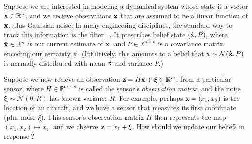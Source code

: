\begin{subappendices}
    \begin{example}
    \label{ex:kalman-general}
    \def\estx{\hat{\mat x}}
    Suppose we are interested in modeling a
    dynamical system whose state is a vector
    $\mathbf x \in \mathbb R^n$, and we recieve observations
    $\mathbf z$ that are assumed to be a linear function of $\mathbf x$,
    plus Gaussian noise.
    In many engineering disciplines, the
    standard way to track this information is
    the \citeauthor{kalman1960new} filter [\citeyear{kalman1960new}].
    It prescribes belief state $(\estx, P)$,
    where $\estx \in \mathbb R^{n}$ is our current estimate of
    $\mathbf x$, and
    $P \in \mathbb R^{n\times n}$
    is a covariance matrix encoding our certainty $\estx$.
    (Intuitively, this amounts to a belief that
    $\mat x \sim \mathcal N(\estx, P)$
    is normally distributed with mean $\estx$ and variance $P$.)

    Suppose we now recieve an observation
    $\mathbf z = H \mathbf x + \boldsymbol\xi \in \mathbb R^m$,
    from a particular sensor,
    where $H \in \mathbb R^{m \times n}$
    is called the sensor's \emph{observation matrix},
    and
    the noise
    $\boldsymbol\xi\sim \mathcal N(0,R)$
    has known variance $R$.
    For example, perhaps $\mathbf x = (x_1, x_2)$ is the location of an aircraft,
    and we have a sensor that
    measures its first coordinate (plus noise $\xi$).
    This sensor's observation matrix
    $H$ then represents
    the map $(x_1, x_2) \mapsto x_1$, and we observe $\mathbf z = x_1 + \xi$.
    How should we update our beliefs in response
    \unskip ?


\end{example}
\end{subappendices}
